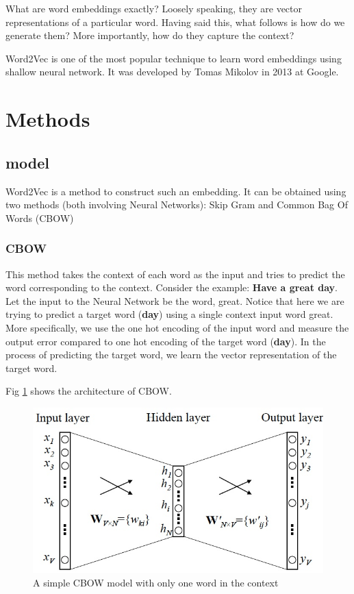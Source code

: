 \documentclass[a4paper,10pt]{article}
\begin{document}
What are word embeddings exactly? Loosely speaking, they are vector representations of a particular word. Having said this, what follows is how do we generate them? More importantly, how do they capture the context?

Word2Vec\cite{mikolov2013efficient} is one of the most popular technique to learn word embeddings using shallow neural network. It was developed by Tomas Mikolov in 2013 at Google.

\section{Methods}
\subsection{model}
Word2Vec is a method to construct such an embedding. It can be obtained using two methods (both involving Neural Networks): Skip Gram and Common Bag Of Words (CBOW)
\subsubsection{CBOW}
This method takes the context of each word as the input and tries to predict the word corresponding to the context. Consider the example: \textbf{Have a great day}. Let the input to the Neural Network be the word, great. Notice that here we are trying to predict a target word (\textbf{day}) using a single context input word great. More specifically, we use the one hot encoding of the input word and measure the output error compared to one hot encoding of the target word (\textbf{day}). In the process of predicting the target word, we learn the vector representation of the target word.

Fig \ref{Fig.single-cbow} shows the architecture of CBOW.
\begin{figure}[htpb]
\centering 
\includegraphics[width=1\textwidth]{report_image/single-cbow.jpg} 
\caption{A simple CBOW model with only one word in the context} 
\label{Fig.single-cbow} 
\end{figure}
\end{document}
